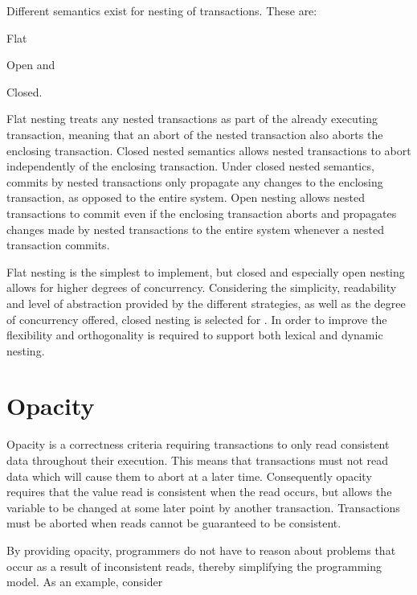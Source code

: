 Different semantics exist for nesting of transactions. These are:  \begin{inparaenum}
\item Flat
\item Open and 
\item Closed\cite[p. 1]{kumar2011hparstm}\cite[p. 42]{harris2010transactional}.
\end{inparaenum}
Flat nesting treats any nested transactions as part of the already executing transaction, meaning that an abort of the nested transaction also aborts the enclosing transaction. Closed nested semantics allows nested transactions to abort independently of the enclosing transaction. Under closed nested semantics, commits by nested transactions only propagate any changes to the enclosing transaction, as opposed to the entire system. Open nesting allows nested transactions to commit even if the enclosing transaction aborts and propagates changes made by nested transactions to the entire system whenever a nested transaction commits.

Flat nesting is the simplest to implement, but closed and especially open nesting allows for higher degrees of concurrency\cite[p. 43]{harris2010transactional}. Considering the simplicity, readability and level of abstraction provided by the different strategies, as well as the degree of concurrency offered, closed nesting is selected for \stmnamesp. In order to improve the flexibility and orthogonality \stmnamesp is required to support both lexical and dynamic nesting.

\section{Opacity}
\label{sec:stm_req_opacity}
Opacity is a correctness criteria requiring transactions to only read consistent data throughout their execution\cite[p. 1]{guerraoui2007opacity}\cite[p. 29]{harris2010transactional}. This means that transactions must not read data which will cause them to abort at a later time. Consequently opacity requires that the value read is consistent when the read occurs, but allows the variable to be changed at some later point by another transaction. Transactions must be aborted when reads cannot be guaranteed to be consistent.

By providing opacity, programmers do not have to reason about problems that occur as a result of inconsistent reads\cite[p. 28]{harris2010transactional}, thereby simplifying the programming model. As an example, consider  

